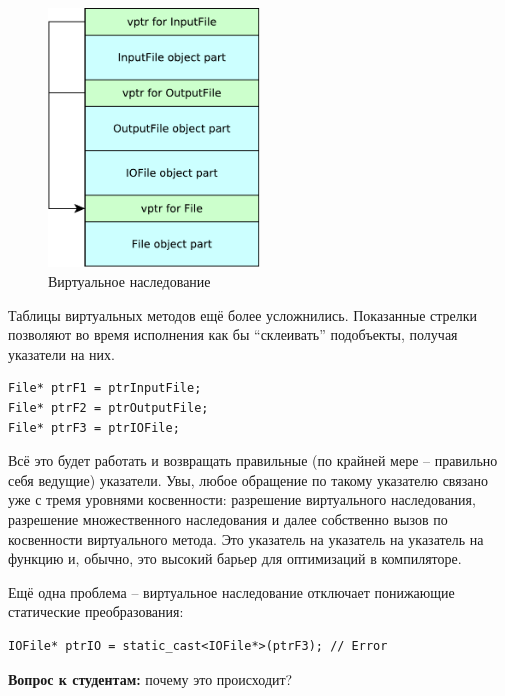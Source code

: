 \documentclass[a4paper,12pt,oneside]{book}
\newif\ifanswers
\begin{document}
\begin{figure}[h!]
\centering
\includegraphics[width=0.5\textwidth]{illustrations/virtualinh-crop.pdf}
\caption{Виртуальное наследование}
\label{fig:virtualinh-crop}
\end{figure}

Таблицы виртуальных методов ещё более усложнились. Показанные стрелки позволяют во время исполнения как бы ``склеивать'' подобъекты, получая указатели на них.

\begin{lstlisting}
File* ptrF1 = ptrInputFile;
File* ptrF2 = ptrOutputFile;
File* ptrF3 = ptrIOFile;
\end{lstlisting}

Всё это будет работать и возвращать правильные (по крайней мере -- правильно себя ведущие) указатели. Увы, любое обращение по такому указателю связано уже с тремя уровнями косвенности: разрешение виртуального наследования, разрешение множественного наследования и далее собственно вызов по косвенности виртуального метода. Это указатель на указатель на указатель на функцию и, обычно, это высокий барьер для оптимизаций в компиляторе.

Ещё одна проблема -- виртуальное наследование отключает понижающие статические преобразования:

\begin{lstlisting}
IOFile* ptrIO = static_cast<IOFile*>(ptrF3); // Error
\end{lstlisting}

\textbf{Вопрос к студентам:} почему это происходит?

\ifanswers
Правильный ответ: потому что для реконструкции объекта с виртуальным наследованием, компилятор должен пройти по каждой из возможных цепочек виртуального наследования и создать каждый из подобъектов. Это неконстантный оверхед по времени и памяти и разработчики языка не стали его закладывать в обычное преобразование.
\fi
\end{document}
